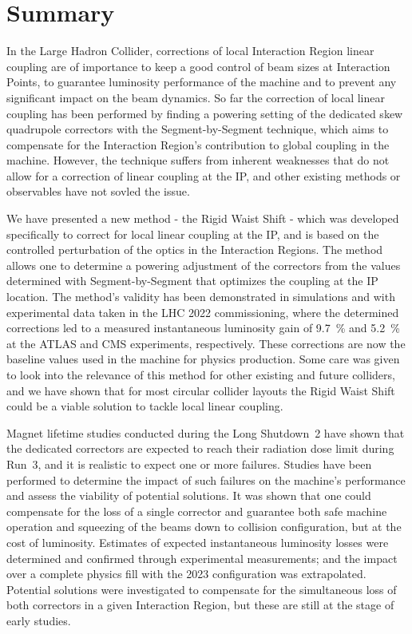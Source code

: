 \section{Summary}

In the Large Hadron Collider, corrections of local Interaction Region linear coupling are of importance to keep a good control of beam sizes at Interaction Points, to guarantee luminosity performance of the machine and to prevent any significant impact on the beam dynamics.
So far the correction of local linear coupling has been performed by finding a powering setting of the dedicated skew quadrupole correctors with the Segment-by-Segment technique, which aims to compensate for the Interaction Region's contribution to global coupling in the machine.
However, the technique suffers from inherent weaknesses that do not allow for a correction of linear coupling at the IP, and other existing methods or observables have not sovled the issue.
\newline

We have presented a new method - the Rigid Waist Shift - which was developed specifically to correct for local linear coupling at the IP, and is based on the controlled perturbation of the optics in the Interaction Regions.
The method allows one to determine a powering adjustment of the correctors from the values determined with Segment-by-Segment that optimizes the coupling at the IP location.
The method's validity has been demonstrated in simulations and with experimental data taken in the LHC \num{2022} commissioning, where the determined corrections led to a measured instantaneous luminosity gain of \qty{9.7}{\percent} and \qty{5.2}{\percent} at the ATLAS and CMS experiments, respectively.
These corrections are now the baseline values used in the machine for physics production.
Some care was given to look into the relevance of this method for other existing and future colliders, and we have shown that for most circular collider layouts the Rigid Waist Shift could be a viable solution to tackle local linear coupling.
\newline

Magnet lifetime studies conducted during the Long Shutdown~\num{2} have shown that the dedicated correctors are expected to reach their radiation dose limit during Run~\num{3}, and it is realistic to expect one or more failures.
Studies have been performed to determine the impact of such failures on the machine's performance and assess the viability of potential solutions.
It was shown that one could compensate for the loss of a single corrector and guarantee both safe machine operation and squeezing of the beams down to collision configuration, but at the cost of luminosity.
Estimates of expected instantaneous luminosity losses were determined and confirmed through experimental measurements; and the impact over a complete physics fill with the \num{2023} configuration was extrapolated.
Potential solutions were investigated to compensate for the simultaneous loss of both correctors in a given Interaction Region, but these are still at the stage of early studies.

\glsresetall                                     %

